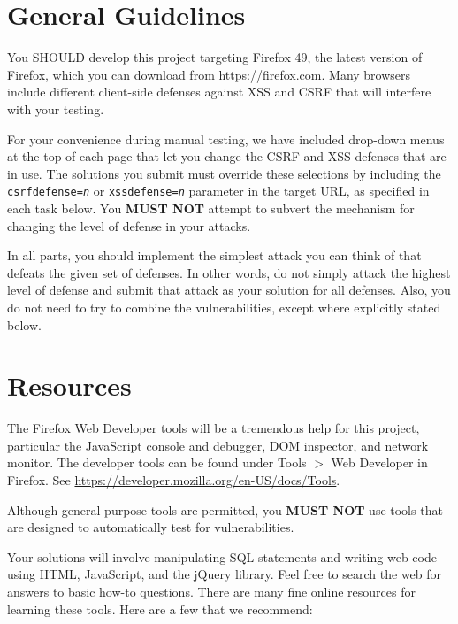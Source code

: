 \documentclass[letterpaper,12pt]{report}
\newcommand{\firefox}{Firefox 49}
\begin{document}

\section*{General Guidelines}

You SHOULD develop this project targeting \firefox, the latest version of Firefox, which you can download from \url{https://firefox.com}.  Many browsers include different client-side defenses against XSS and CSRF that will interfere with your testing.

\medskip

For your convenience during manual testing, we have included drop-down menus at the top of each page that let you change the CSRF and XSS defenses that are in use.  The solutions you submit must override these selections by including the \texttt{csrfdefense=\emph{n}} or \texttt{xssdefense=\emph{n}} parameter in the target URL, as specified in each task below.  You \textbf{MUST NOT} attempt to subvert the mechanism for changing the level of defense in your attacks.

\medskip

In all parts, you should implement the simplest attack you can think of that defeats the given set of defenses. In other words, do not simply attack the highest level of defense and submit that attack as your solution for all defenses. Also, you do not need to try to combine the vulnerabilities, except where explicitly stated below.

\section*{Resources} 
\label{sec:resources}

The Firefox Web Developer tools will be a tremendous help for this project, particular the JavaScript console and debugger, DOM inspector, and network monitor.  The developer tools can be found under Tools $>$ Web Developer in Firefox.  See \url{https://developer.mozilla.org/en-US/docs/Tools}.

\smallskip

Although general purpose tools are permitted, you \textbf{MUST NOT} use tools that are designed to automatically test for vulnerabilities.

\medskip

Your solutions will involve manipulating SQL statements and writing web code using HTML, JavaScript, and the jQuery library.  Feel free to search the web for answers to basic how-to questions.  There are many fine online resources for learning these tools.  Here are a few that we recommend:
\medskip
\end{document}
